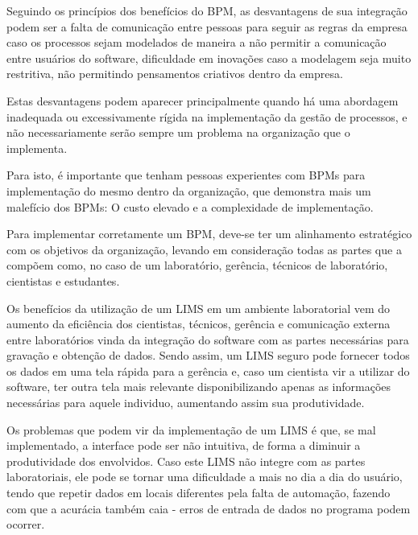 Seguindo os princípios dos benefícios do BPM, as desvantagens de sua integração podem ser a falta de comunicação entre pessoas para seguir as regras da empresa caso os processos sejam modelados de maneira a não permitir a comunicação entre usuários do software, dificuldade em inovações caso a modelagem seja muito restritiva, não permitindo pensamentos criativos dentro da empresa.

Estas desvantagens podem aparecer principalmente quando há uma abordagem inadequada ou excessivamente rígida na implementação da gestão de processos, e não necessariamente serão sempre um problema na organização que o implementa.

Para isto, é importante que tenham pessoas experientes com BPMs para implementação do mesmo dentro da organização, que demonstra mais um malefício dos BPMs: O custo elevado e a complexidade de implementação.

Para implementar corretamente um BPM, deve-se ter um alinhamento estratégico com os objetivos da organização, levando em consideração todas as partes que a compõem como, no caso de um laboratório, gerência, técnicos de laboratório, cientistas e estudantes.



Os benefícios da utilização de um LIMS em um ambiente laboratorial vem do aumento da eficiência dos cientistas, técnicos, gerência e comunicação externa entre laboratórios vinda da integração do software com as partes necessárias para gravação e obtenção de dados. Sendo assim, um LIMS seguro pode fornecer todos os dados em uma tela rápida para a gerência e, caso um cientista vir a utilizar do software, ter outra tela mais relevante disponibilizando apenas as informações necessárias para aquele individuo, aumentando assim sua produtividade.


Os problemas que podem vir da implementação de um LIMS é que, se mal implementado, a interface pode ser não intuitiva, de forma a diminuir a produtividade dos envolvidos. Caso este LIMS não integre com as partes laboratoriais, ele pode se tornar uma dificuldade a mais no dia a dia do usuário, tendo que repetir dados em locais diferentes pela falta de automação, fazendo com que a acurácia também caia - erros de entrada de dados no programa podem ocorrer.

